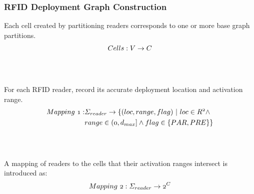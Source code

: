 \begin{frame}
\begin{columns}[c]
\end{columns}
\end{frame}


\begin{frame}
\frametitle{RFID Deployment Graph Construction}

  \small{Each cell created by partitioning readers corresponds to one or more base graph partitions.}
  \pause
  \begin{equation}
  \mathnormal{Cells: V \rightarrow C}
  \end{equation}
  \\~\\
  \pause

  \small{For each RFID reader, record its accurate deployment location and activation range.}
  \pause
  \begin{equation}
  \begin{split}
  \mathnormal{Mapping~1}: & \mathnormal{\Sigma_{reader} \rightarrow \{ (loc, range, flag)~|~loc \in R^2 \wedge} \\
    & \mathnormal{range \in (0,d_{max}] \wedge flag \in \{ PAR, PRE \} \}}
  \end{split}
  \end{equation}
  \\~\\
  \pause

  \small{A mapping of readers to the cells that their activation ranges intersect is introduced as:}
  \pause
  \begin{equation}
  \mathnormal{
  Mapping~2: \Sigma_{reader} \rightarrow 2^C
  }
  \end{equation}

\end{frame}



